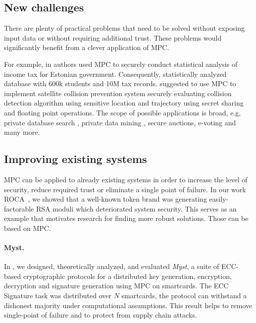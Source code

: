 \documentclass[
  digital, %
  twoside, %
  table,   %
  lof,     %
  lot,     %
]{fithesis3}
\newcounter{ph4_show_guides}
\theoremstyle{definition}
\theoremstyle{remark}
\begin{document}
\subsection{New challenges} %
There are plenty of practical problems that need to be solved without exposing input data or without requiring additional trust. These problems would significantly benefit from a clever application of MPC.

For example, in \cite{BJSV15} authors used MPC to securely conduct statistical analysis of income tax for Estonian government. Consequently, \cite{BKKRST16} statistically analyzed database with 600k students and 10M tax records. \cite{KW15} suggested to use MPC to implement satellite collision prevention system securely evaluating collision detection algorithm using sensitive location and trajectory using secret sharing and floating point operations. The scope of possible applications is broad, e.g,  private database search \cite{Bertino2005, Naor:1999:PPA:336992.337028}, private data mining \cite{Aldeen2015}, secure auctions, e-voting and many more.

\subsection{Improving existing systems}
MPC can be applied to already existing systems in order to increase the level of security, reduce required trust or eliminate a single point of failure.
In our work ROCA~\cite{2017-ccs-nemec}, we showed that a well-known token brand was generating easily-factorable RSA moduli which deteriorated system security. This serves as an example that motivates research for finding more robust solutions. Those can be based on MPC.
    
\paragraph{Myst.} In \cite{2017-ccs-mavroudis}, we designed, theoretically analyzed, and evaluated \emph{Myst}, a suite of ECC-based cryptographic protocols for a distributed key generation, encryption, decryption and signature generation using MPC on smartcards.
The ECC Signature task was distributed over $N$ smartcards, the protocol can withstand a dishonest majority under computational assumptions. This result helps to remove single-point of failure and to protect from supply chain attacks.
    
\end{document}
